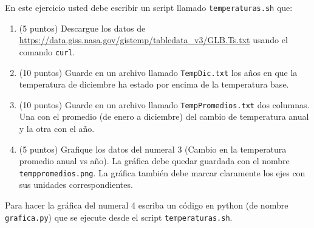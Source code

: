 \documentclass[11pt,letterpaper]{exam}
\begin{document}
\begin{questions}
En este ejercicio usted debe escribir un script llamado
\verb"temperaturas.sh" que: 

\begin{enumerate}
\item (5 puntos) Descargue los datos de
\url{https://data.giss.nasa.gov/gistemp/tabledata_v3/GLB.Ts.txt} usando el comando \verb"curl".
\item (10 puntos) Guarde en un archivo llamado \verb"TempDic.txt" los años en
que la temperatura de diciembre ha estado por encima de la temperatura base.
\item (10 puntos) Guarde en un archivo llamado \verb"TempPromedios.txt"
  dos columnas. Una con el promedio (de enero a diciembre) del cambio de temperatura anual y
  la otra con el año.    
\item (5 puntos) Grafique los datos del numeral 3 (Cambio en la temperatura promedio anual vs año). La gr\'afica debe
  quedar guardada con el nombre \verb"temppromedios.png". La gr\'afica
  tambi\'en debe marcar
  claramente los ejes con sus unidades correspondientes. 

\end{enumerate}

Para hacer la gráfica del numeral 4 escriba un código en python (de
nombre \verb"grafica.py") que se ejecute desde el script
\verb"temperaturas.sh". 



\end{questions}
\end{document}
